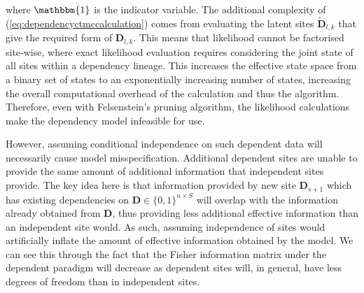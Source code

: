 where $\mathbbm{1}$ is the indicator variable. The additional complexity of (\ref{eq:dependencyctmccalculation}) comes from evaluating the latent sites $\tilde{\mathbf{D}}_{l, k}$ that give the required form of $\mathbf{D}_{l, k}$. This means that likelihood cannot be factorised site-wise, where exact likelihood evaluation requires considering the joint state of all sites within a dependency lineage. This increases the effective state space from a binary set of states to an exponentially increasing number of states, increasing the overall computational overhead of the calculation and thus the algorithm. Therefore, even with Felsenstein's pruning algorithm, the likelihood calculations make the dependency model infeasible for use.

However, assuming conditional independence on such dependent data will necessarily cause model misspecification. Additional dependent sites are unable to provide the same amount of additional information that independent sites provide. The key idea here is that information provided by new site $\mathbf{D}_{s+1}$ which has existing dependencies on $\mathbf{D} \in \{0, 1\}^{n \times S}$ will overlap with the information already obtained from $\mathbf{D}$, thus providing less additional effective information than an independent site would. As such, assuming independence of sites would artificially inflate the amount of effective information obtained by the model. We can see this through the fact that the Fisher information matrix under the dependent paradigm will decrease as dependent sites will, in general, have less degrees of freedom than in independent sites. 

